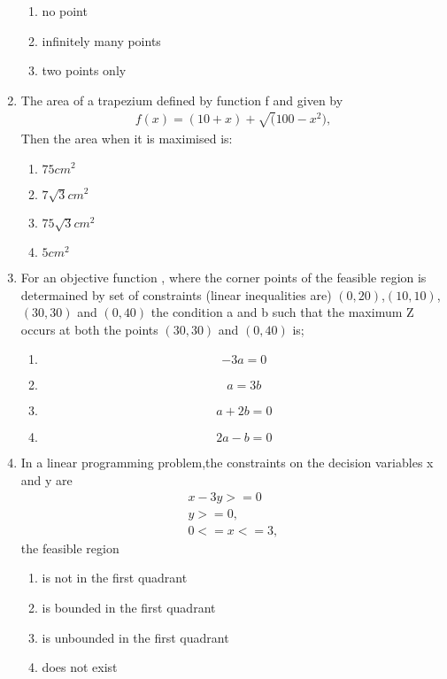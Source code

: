 \documentclass{article}
\begin{document}
\begin{enumerate}
\begin{enumerate}[label = (\Alph*)]
			\item no point
			\item infinitely many points
			\item two points only
		\end{enumerate}
	\item The area of a trapezium  defined by function f and given by 
		\begin{align}
		\text{$f(x) = (10+x)+\sqrt(100-x^2)$},
		\end{align}
		Then the area when it is maximised is:
		\begin{enumerate}[label=(\Alph*)]
			\item $75cm^2$
			\item $7\sqrt{3}cm^2$
			\item $75\sqrt{3}cm^2$
			\item $5cm^2$
		\end{enumerate}
	\item For an objective function , where  the corner points of the feasible region is determained by set of constraints (linear inequalities are) $(0,20)$,$(10,10)$,$(30,30)$ and $(0,40)$ the condition a and b such that the maximum Z occurs at both the points $(30,30)$ and $(0,40)$ is;
		\begin{enumerate}[label=(\Alph*)]
			\item 
				$$-3a=0 $$
			\item 
				$$ a=3b $$
			\item 
				$$ a+2b=0 $$
			\item 
				$$ 2a-b=0 $$
		\end{enumerate}
	\item In a linear programming problem,the constraints on the decision variables x and y are 
		\begin{align}
		    x-3y>=0
		   \\ y>=0,
		   \\ 0<=x<=3,
		\end{align}
		the feasible region 
		\begin{enumerate}[label=(\Alph*)]
			\item is not in the first quadrant
			\item is bounded in the first quadrant
			\item is unbounded in the first quadrant
			\item does not exist
		\end{enumerate}
 \end{enumerate}
 
\end{document}
